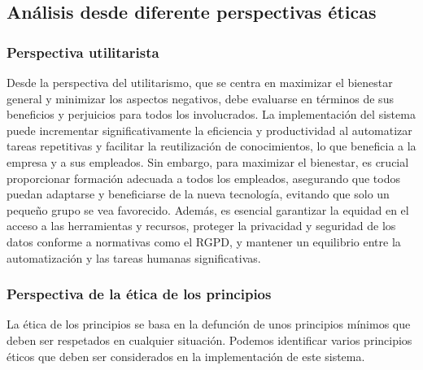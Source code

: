 \subsection{Análisis desde diferente perspectivas éticas}
\subsubsection{Perspectiva utilitarista}
Desde la perspectiva del utilitarismo, que se centra en maximizar el bienestar 
general y minimizar los aspectos negativos, debe evaluarse en términos de sus 
beneficios y perjuicios para todos los involucrados. La implementación del sistema 
puede incrementar significativamente la eficiencia 
y productividad al automatizar tareas repetitivas y facilitar la reutilización 
de conocimientos, lo que beneficia a la empresa y a sus empleados. Sin embargo, 
para maximizar el bienestar, es crucial proporcionar formación adecuada a todos 
los empleados, asegurando que todos puedan adaptarse y beneficiarse de la nueva 
tecnología, evitando que solo un pequeño grupo se vea favorecido. Además, es 
esencial garantizar la equidad en el acceso a las herramientas y recursos, proteger 
la privacidad y seguridad de los datos conforme a normativas como el RGPD, y 
mantener un equilibrio entre la automatización y las tareas humanas significativas.

\subsubsection{Perspectiva de la ética de los principios}
La ética de los principios se basa en la defunción de unos principios mínimos
que deben ser respetados en cualquier situación. Podemos identificar varios 
principios éticos que deben ser considerados en la implementación de este sistema.

